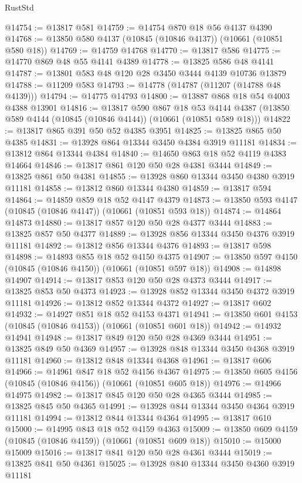 \begin{lexlean}{RustStd}
\begin{coremodule}
@14754 := @13817 @581
@14759 := @14754 @870 @18 @56 @4137 @4390
@14768 := @13850 @580 @4137 (@10845 (@10846 @4137)) (@10661 (@10851 @580 @18))
@14769 := @14759 @14768
@14770 := @13817 @586
@14775 := @14770 @869 @48 @55 @4141 @4389
@14778 := @13825 @586 @48 @4141
@14787 := @13801 @583 @48 @120 @28 @3450 @3444 @4139 @10736 @13879
@14788 := @11209 @583
@14793 := @14778 (@14787 (@11207 (@14788 @48 @4139)))
@14794 := @14775 @14793
@14800 := @13887 @868 @18 @54 @4003 @4388 @13901
@14816 := @13817
    @590
    @867
    @18
    @53
    @4144
    @4387
    (@13850 @589 @4144 (@10845 (@10846 @4144)) (@10661 (@10851 @589 @18)))
@14822 := @13817 @865 @391 @50 @52 @4385 @3951
@14825 := @13825 @865 @50 @4385
@14831 := @13928 @864 @13344 @3450 @4384 @3919 @11181
@14834 := @13812 @864 @13344 @4384
@14840 := @14650 @863 @18 @52 @4119 @4383 @14664
@14846 := @13817 @861 @120 @50 @28 @4381 @3444
@14849 := @13825 @861 @50 @4381
@14855 := @13928 @860 @13344 @3450 @4380 @3919 @11181
@14858 := @13812 @860 @13344 @4380
@14859 := @13817 @594
@14864 := @14859 @859 @18 @52 @4147 @4379
@14873 := @13850 @593 @4147 (@10845 (@10846 @4147)) (@10661 (@10851 @593 @18))
@14874 := @14864 @14873
@14880 := @13817 @857 @120 @50 @28 @4377 @3444
@14883 := @13825 @857 @50 @4377
@14889 := @13928 @856 @13344 @3450 @4376 @3919 @11181
@14892 := @13812 @856 @13344 @4376
@14893 := @13817 @598
@14898 := @14893 @855 @18 @52 @4150 @4375
@14907 := @13850 @597 @4150 (@10845 (@10846 @4150)) (@10661 (@10851 @597 @18))
@14908 := @14898 @14907
@14914 := @13817 @853 @120 @50 @28 @4373 @3444
@14917 := @13825 @853 @50 @4373
@14923 := @13928 @852 @13344 @3450 @4372 @3919 @11181
@14926 := @13812 @852 @13344 @4372
@14927 := @13817 @602
@14932 := @14927 @851 @18 @52 @4153 @4371
@14941 := @13850 @601 @4153 (@10845 (@10846 @4153)) (@10661 (@10851 @601 @18))
@14942 := @14932 @14941
@14948 := @13817 @849 @120 @50 @28 @4369 @3444
@14951 := @13825 @849 @50 @4369
@14957 := @13928 @848 @13344 @3450 @4368 @3919 @11181
@14960 := @13812 @848 @13344 @4368
@14961 := @13817 @606
@14966 := @14961 @847 @18 @52 @4156 @4367
@14975 := @13850 @605 @4156 (@10845 (@10846 @4156)) (@10661 (@10851 @605 @18))
@14976 := @14966 @14975
@14982 := @13817 @845 @120 @50 @28 @4365 @3444
@14985 := @13825 @845 @50 @4365
@14991 := @13928 @844 @13344 @3450 @4364 @3919 @11181
@14994 := @13812 @844 @13344 @4364
@14995 := @13817 @610
@15000 := @14995 @843 @18 @52 @4159 @4363
@15009 := @13850 @609 @4159 (@10845 (@10846 @4159)) (@10661 (@10851 @609 @18))
@15010 := @15000 @15009
@15016 := @13817 @841 @120 @50 @28 @4361 @3444
@15019 := @13825 @841 @50 @4361
@15025 := @13928 @840 @13344 @3450 @4360 @3919 @11181

\end{coremodule}
\end{lexlean}
